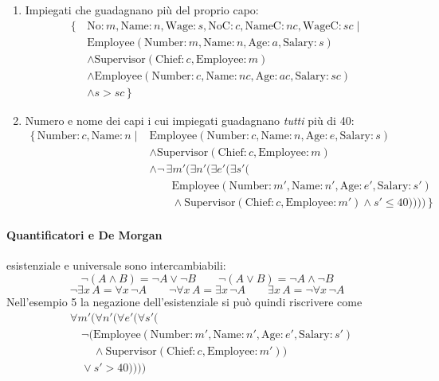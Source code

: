 \documentclass[a4paper,12pt]{article}
\begin{document}
\begin{enumerate}
\begin{align*}
        \text{Salary}: s) \wedge s > 40\\
      & \wedge \text{Supervisor}(\text{Chief}: c, \text{Employee}: m)\\
      & \wedge \text{Employee}(\text{Number}: c, \text{Name}: nc,
        \text{Age}: ac, \text{Salary}: sc) \,\}
    \end{align*}
  \item[4.] Impiegati che guadagnano più del proprio capo:
    \begin{align*}
      \{\, & \text{No}: m, \text{Name}: n, \text{Wage}: s, \text{NoC}: c,
        \text{NameC}: nc, \text{WageC}: sc \mid\\
      & \text{Employee}(\text{Number}: m, \text{Name}: n, \text{Age}: a,
        \text{Salary}: s)\\
      & \wedge \text{Supervisor}(\text{Chief}: c, \text{Employee}: m)\\
      & \wedge \text{Employee}(\text{Number}: c, \text{Name}: nc,
        \text{Age}: ac, \text{Salary}: sc)\\
      & \wedge s > sc \,\}
    \end{align*}
  \item[5.] Numero e nome dei capi i cui impiegati guadagnano \emph{tutti} più
    di 40:
    \begin{align*}
      \{\, \text{Number}: c, \text{Name}: n \mid{}
      & \text{Employee}(\text{Number}: c, \text{Name}: n, \text{Age}: e, \text{Salary}: s)\\
      & \wedge \text{Supervisor}(\text{Chief}: c, \text{Employee}: m)\\
      & \wedge \neg\, \exists m' (\exists n' (\exists e' (\exists s' (\\
      & \qquad \text{Employee}(\text{Number}: m', \text{Name}: n', \text{Age}: e', \text{Salary}: s')\\
      & \qquad \wedge \text{Supervisor}(\text{Chief}: c, \text{Employee}: m')
        \wedge s' \leq 40)))) \,\}
    \end{align*}
\end{enumerate}

\paragraph{Quantificatori e De Morgan} esistenziale e universale sono
intercambiabili:
\[
  \neg(A \wedge B) = \neg A \vee \neg B \qquad
  \neg(A \vee B) = \neg A \wedge \neg B
\]
\[
  \neg \exists x\, A = \forall x\, \neg A \qquad
  \neg \forall x\, A = \exists x\, \neg A \qquad
  \exists x\, A = \neg \forall x\, \neg A
\]
Nell'esempio 5 la negazione dell'esistenziale si può quindi riscrivere come
\begin{align*}
  & \forall m' (\forall n' (\forall e' (\forall s' (\\
  & \quad \neg(\text{Employee}(\text{Number}: m', \text{Name}: n', \text{Age}: e', \text{Salary}: s')\\
  & \quad \phantom{\neg(} \wedge
    \text{Supervisor}(\text{Chief}: c, \text{Employee}: m'))\\
  & \quad \vee s' > 40))))
\end{align*}
\end{document}
